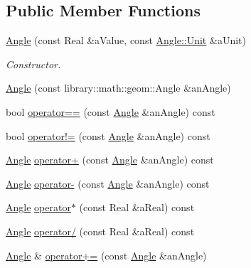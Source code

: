 \subsection*{Public Member Functions}
\begin{DoxyCompactItemize}
\item 
\hyperlink{classlibrary_1_1physics_1_1units_1_1_angle_a6cd94e306cdc3a15fe13135729299d99}{Angle} (const Real \&a\+Value, const \hyperlink{classlibrary_1_1physics_1_1units_1_1_angle_a3c329d415a61783b16ce481874cc5956}{Angle\+::\+Unit} \&a\+Unit)
\begin{DoxyCompactList}\small\item\em Constructor. \end{DoxyCompactList}\item 
\hyperlink{classlibrary_1_1physics_1_1units_1_1_angle_a6c841e6d88730f6b1289b02dccf591f1}{Angle} (const library\+::math\+::geom\+::\+Angle \&an\+Angle)
\item 
bool \hyperlink{classlibrary_1_1physics_1_1units_1_1_angle_a7438eef61dd54f58c4270fae0d2ccb20}{operator==} (const \hyperlink{classlibrary_1_1physics_1_1units_1_1_angle}{Angle} \&an\+Angle) const
\item 
bool \hyperlink{classlibrary_1_1physics_1_1units_1_1_angle_ad25b468efa92e37f8d45d624a9ed6497}{operator!=} (const \hyperlink{classlibrary_1_1physics_1_1units_1_1_angle}{Angle} \&an\+Angle) const
\item 
\hyperlink{classlibrary_1_1physics_1_1units_1_1_angle}{Angle} \hyperlink{classlibrary_1_1physics_1_1units_1_1_angle_aebf6869b414e02af92a924d561822824}{operator+} (const \hyperlink{classlibrary_1_1physics_1_1units_1_1_angle}{Angle} \&an\+Angle) const
\item 
\hyperlink{classlibrary_1_1physics_1_1units_1_1_angle}{Angle} \hyperlink{classlibrary_1_1physics_1_1units_1_1_angle_a034a88587139bb8642e80f353ead5ce2}{operator-\/} (const \hyperlink{classlibrary_1_1physics_1_1units_1_1_angle}{Angle} \&an\+Angle) const
\item 
\hyperlink{classlibrary_1_1physics_1_1units_1_1_angle}{Angle} \hyperlink{classlibrary_1_1physics_1_1units_1_1_angle_a958b708b331ded088189882187a4de89}{operator$\ast$} (const Real \&a\+Real) const
\item 
\hyperlink{classlibrary_1_1physics_1_1units_1_1_angle}{Angle} \hyperlink{classlibrary_1_1physics_1_1units_1_1_angle_a4807751951c97b1de78e7b98b51abaed}{operator/} (const Real \&a\+Real) const
\item 
\hyperlink{classlibrary_1_1physics_1_1units_1_1_angle}{Angle} \& \hyperlink{classlibrary_1_1physics_1_1units_1_1_angle_a5f20b012cb332e631a6271144a0817a2}{operator+=} (const \hyperlink{classlibrary_1_1physics_1_1units_1_1_angle}{Angle} \&an\+Angle)

\end{DoxyCompactItemize}

